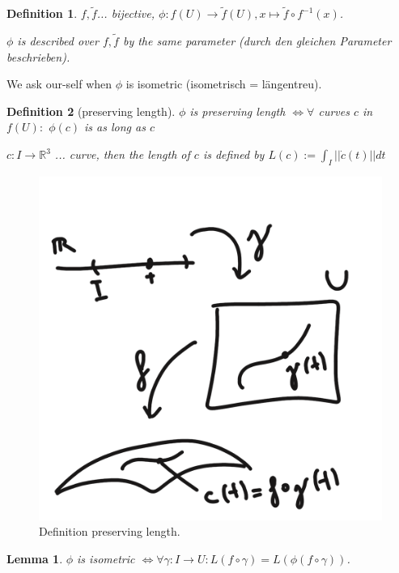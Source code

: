 \documentclass[]{article}
\newtheorem{lemma}{Lemma}
\newtheorem{definition}{Definition}
\begin{document}
\begin{definition}	
	$f, \tilde{f}$... bijective, $\phi:f(U) \rightarrow \tilde{f}(U), x \mapsto \tilde{f} \circ f^{-1}(x)$.
	
	$\phi$ is described over $f, \tilde{f}$ by the same parameter (durch den gleichen Parameter beschrieben).
\end{definition}



We ask our-self when $\phi$ is isometric (isometrisch = längentreu).

\begin{definition}[preserving length]
	$\phi$ is preserving length $\iff \forall $ curves $c$ in $f(U):$ $\phi(c)$ is as long as $c$
	
	$c:I \rightarrow \mathbb{R}^3$ ... curve, then the length of $c$ is defined by $L(c) := \int_{I} ||\dot{c}(t)|| dt$
\end{definition} 

\begin{figure}[h!]
	\centering
	\includegraphics[width=0.3\linewidth]{figures/preserving_length}
	\caption{Definition preserving length.}
	\label{fig:preserving_length}
\end{figure}	

\begin{lemma}
	$\phi$ is isometric $\iff \forall \gamma : I \rightarrow U: L(f \circ \gamma) = L(\phi(f \circ \gamma))$.
\end{lemma}
\end{document}
